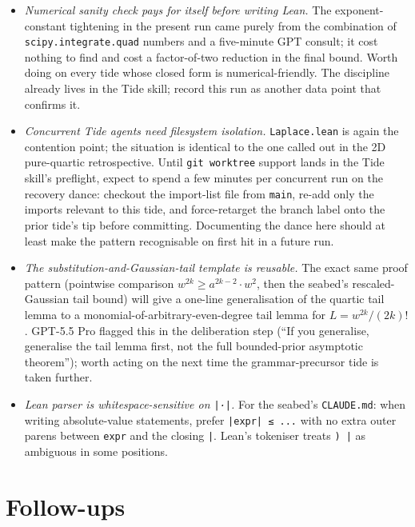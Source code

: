 \documentclass[11pt]{article}
\begin{document}
\begin{itemize}
\item \emph{Numerical sanity check pays for itself before writing Lean.}
The exponent-constant tightening in the present run came purely from the
combination of \texttt{scipy.integrate.quad} numbers and a five-minute
GPT consult; it cost nothing to find and cost a factor-of-two reduction
in the final bound. Worth doing on every tide whose closed form is
numerical-friendly. The discipline already lives in the Tide skill;
record this run as another data point that confirms it.

\item \emph{Concurrent Tide agents need filesystem isolation.}
\texttt{Laplace.lean} is again the contention point; the situation is
identical to the one called out in the 2D pure-quartic retrospective.
Until \texttt{git worktree} support lands in the Tide skill's preflight,
expect to spend a few minutes per concurrent run on the recovery dance:
checkout the import-list file from \texttt{main}, re-add only the
imports relevant to this tide, and force-retarget the branch label onto
the prior tide's tip before committing. Documenting the dance here
should at least make the pattern recognisable on first hit in a future
run.

\item \emph{The substitution-and-Gaussian-tail template is reusable.}
The exact same proof pattern (pointwise comparison
$w^{2k} \ge a^{2k-2} \cdot w^2$, then the seabed's rescaled-Gaussian
tail bound) will give a one-line generalisation of the quartic tail
lemma to a monomial-of-arbitrary-even-degree tail lemma for
$L = w^{2k}/(2k)!$. GPT-5.5 Pro flagged this in the deliberation step
(``If you generalise, generalise the tail lemma first, not the full
bounded-prior asymptotic theorem''); worth acting on the next time the
grammar-precursor tide is taken further.

\item \emph{Lean parser is whitespace-sensitive on \texttt{|·|}.}
For the seabed's \texttt{CLAUDE.md}: when writing absolute-value
statements, prefer \verb!|expr| ≤ ...! with no extra outer parens
between \verb!expr! and the closing \verb!|!. Lean's tokeniser treats
\verb!) |! as ambiguous in some positions.
\end{itemize}

\section{Follow-ups}
\end{document}
